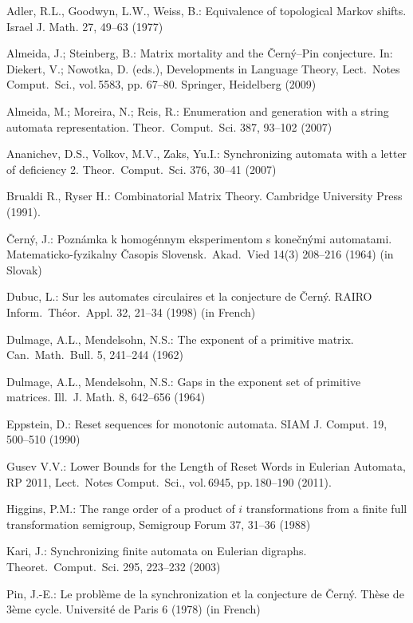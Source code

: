 \documentclass[11pt]{article}
\begin{document}
\begin{thebibliography}{99}
Adler, R.L., Goodwyn, L.W., Weiss, B.: Equivalence of topological Markov shifts.
Israel J. Math. 27, 49--63 (1977)

Almeida, J.; Steinberg, B.: Matrix mortality and the \v{C}ern\'{y}--Pin
conjecture. In:  Diekert, V.; Nowotka, D. (eds.), Developments in
Language Theory, Lect.\ Notes Comput.\ Sci., vol.\,5583, pp. 67--80.
Springer, Heidelberg (2009)

Almeida, M.; Moreira, N.; Reis, R.: Enumeration and generation with a string
automata representation. Theor.\ Comput.\ Sci. 387, 93--102 (2007)

Ananichev, D.S., Volkov, M.V., Zaks, Yu.I.: Synchronizing automata
with a letter of deficiency 2. Theor.\ Comput.\ Sci. 376, 30--41 (2007)

Brualdi R., Ryser H.: Combinatorial Matrix Theory. Cambridge University Press (1991).

\v{C}ern\'{y}, J.: Pozn\'{a}mka k homog\'{e}nnym eksperimentom s
kone\v{c}n\'{y}mi automatami. Matematicko-fyzikalny \v{C}asopis
Slovensk.\ Akad.\ Vied 14(3) 208--216 (1964) (in Slovak)

Dubuc, L.: Sur les automates circulaires et la conjecture de
\v{C}ern\'y. RAIRO Inform.\ Th\'eor.\ Appl. 32, 21--34 (1998) (in
French)

Dulmage, A.L., Mendelsohn, N.S.: The exponent of a primitive matrix.
Can.\ Math.\ Bull. 5, 241--244 (1962)

Dulmage, A.L., Mendelsohn, N.S.: Gaps in the exponent set of primitive
matrices. Ill.\ J. Math. 8, 642--656 (1964)

Eppstein, D.: Reset sequences for monotonic automata. SIAM J.
Comput. 19, 500--510 (1990)

Gusev V.V.: Lower Bounds for the Length of Reset Words in Eulerian Automata, RP 2011,
Lect.\ Notes Comput.\ Sci., vol.\,6945, pp.\,180--190 (2011).

Higgins, P.M.: The range order of a product of $i$ transformations
from a finite full transformation semigroup, Semigroup Forum 37, 31--36
(1988)

Kari, J.: Synchronizing finite automata on Eulerian digraphs.
Theoret.\ Comput.\ Sci. 295, 223--232 (2003)

Pin, J.-E.: Le probl\`eme de la synchronization et la conjecture de
\v{C}ern\'y. Th\`ese de 3\`eme cycle. Universit\'e de Paris 6 (1978) (in
French)


\end{thebibliography}
\end{document}
